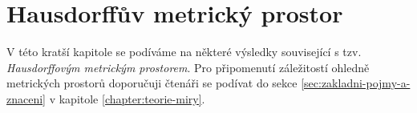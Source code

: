 \chapter{Hausdorffův metrický prostor}\label{chapter:hausdorffuv-mp}

V této kratší kapitole se podíváme na některé výsledky související s tzv. \emph{Hausdorffovým metrickým prostorem}. Pro připomenutí záležitostí ohledně metrických prostorů doporučuji čtenáři se podívat do sekce \ref{sec:zakladni-pojmy-a-znaceni} v kapitole \ref{chapter:teorie-miry}.